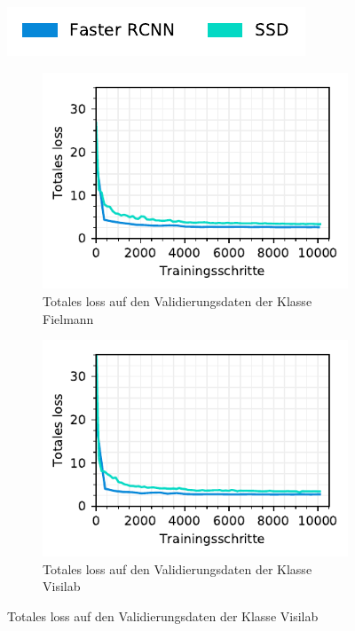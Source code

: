 \begin{figure}[h!] 
  \captionsetup{width=.9\linewidth}
  \label{fig:specific-ie:loss}
  \caption{Totales Loss auf den Validierungsdaten der Leistungserbringer spezifischen Modelle}
  \centering
  \includegraphics[scale=1]{graphics/matplot/img-detection__legend_1.pdf}
  \begin{subfigure}[b]{0.45\linewidth}
    \centering
    \includegraphics[scale=1]{graphics/matplot/img-detection__fielmann__loss.pdf}
    \caption{Totales loss auf den Validierungsdaten der Klasse Fielmann} 
    \label{fig:specific-ie:fielmann:loss}
    \vspace{2ex}
  \end{subfigure}%
  \begin{subfigure}[b]{0.45\linewidth}
    \centering
    \includegraphics[scale=1]{graphics/matplot/img-detection__visilab__loss.pdf}
    \caption{Totales loss auf den Validierungsdaten der Klasse Visilab} 
    \label{fig:specific-ie:visilab:loss}
    \vspace{2ex}
  \end{subfigure} 
\end{figure}


